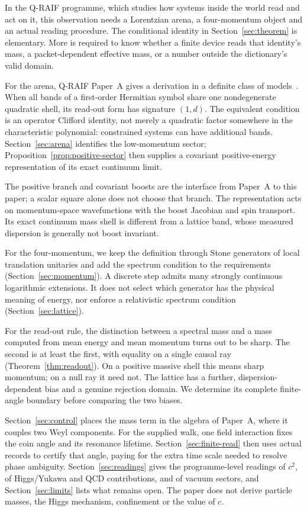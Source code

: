 \documentclass[12pt,a4paper]{article}
\theoremstyle{definition}
\theoremstyle{remark}
\begin{document}
In the Q-RAIF programme, which studies how systems inside the world read and act on it, this observation needs a Lorentzian arena, a four-momentum object and an actual reading procedure. The conditional identity in Section~\ref{sec:theorem} is elementary. More is required to know whether a finite device reads that identity's mass, a packet-dependent effective mass, or a number outside the dictionary's valid domain.

For the arena, Q-RAIF Paper~A gives a derivation in a definite class of models~\cite{Liu2026QRAIFA}. When all bands of a first-order Hermitian symbol share one nondegenerate quadratic shell, its read-out form has signature $(1,d)$. The equivalent condition is an operator Clifford identity, not merely a quadratic factor somewhere in the characteristic polynomial: constrained systems can have additional bands. Section~\ref{sec:arena} identifies the low-momentum sector; Proposition~\ref{prop:positive-sector} then supplies a covariant positive-energy representation of its exact continuum limit.

The positive branch and covariant boosts are the interface from Paper~A to this paper; a scalar square alone does not choose that branch. The representation acts on momentum-space wavefunctions with the boost Jacobian and spin transport. Its exact continuum mass shell is different from a lattice band, whose measured dispersion is generally not boost invariant.

For the four-momentum, we keep the definition through Stone generators of local translation unitaries and add the spectrum condition to the requirements (Section~\ref{sec:momentum}). A discrete step admits many strongly continuous logarithmic extensions. It does not select which generator has the physical meaning of energy, nor enforce a relativistic spectrum condition (Section~\ref{sec:lattice}).

For the read-out rule, the distinction between a spectral mass and a mass computed from mean energy and mean momentum turns out to be sharp. The second is at least the first, with equality on a single causal ray (Theorem~\ref{thm:readout}). On a positive massive shell this means sharp momentum; on a null ray it need not. The lattice has a further, dispersion-dependent bias and a genuine rejection domain. We determine its complete finite-angle boundary before comparing the two biases.

Section~\ref{sec:control} places the mass term in the algebra of Paper~A, where it couples two Weyl components. For the supplied walk, one field interaction fixes the coin angle and its resonance lifetime. Section~\ref{sec:finite-read} then uses actual records to certify that angle, paying for the extra time scale needed to resolve phase ambiguity. Section~\ref{sec:readings} gives the programme-level readings of $c^2$, of Higgs/Yukawa and QCD contributions, and of vacuum sectors, and Section~\ref{sec:limits} lists what remains open. The paper does not derive particle masses, the Higgs mechanism, confinement or the value of $c$.
\end{document}
